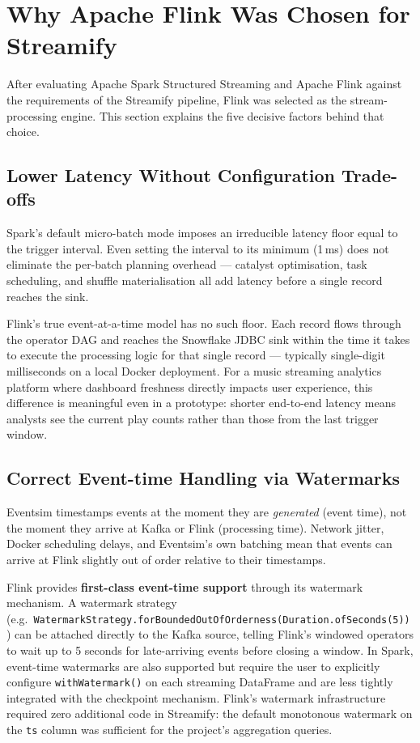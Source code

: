 \section{Why Apache Flink Was Chosen for Streamify}

After evaluating Apache Spark Structured Streaming and Apache Flink against the requirements
of the Streamify pipeline, Flink was selected as the stream-processing engine.
This section explains the five decisive factors behind that choice.

\subsection{Lower Latency Without Configuration Trade-offs}

Spark's default micro-batch mode imposes an irreducible latency floor equal to the trigger
interval.
Even setting the interval to its minimum (1\,ms) does not eliminate the per-batch planning
overhead — catalyst optimisation, task scheduling, and shuffle materialisation all add latency
before a single record reaches the sink.

Flink's true event-at-a-time model has no such floor.
Each record flows through the operator DAG and reaches the Snowflake JDBC sink within the
time it takes to execute the processing logic for that single record — typically single-digit
milliseconds on a local Docker deployment.
For a music streaming analytics platform where dashboard freshness directly impacts user
experience, this difference is meaningful even in a prototype: shorter end-to-end latency
means analysts see the current play counts rather than those from the last trigger window.

\subsection{Correct Event-time Handling via Watermarks}

Eventsim timestamps events at the moment they are \emph{generated} (event time), not the moment
they arrive at Kafka or Flink (processing time).
Network jitter, Docker scheduling delays, and Eventsim's own batching mean that events can
arrive at Flink slightly out of order relative to their timestamps.

Flink provides \textbf{first-class event-time support} through its watermark mechanism.
A watermark strategy (e.g.\ \texttt{WatermarkStrategy.forBoundedOutOfOrderness(Duration.ofSeconds(5))})
can be attached directly to the Kafka source, telling Flink's windowed operators to wait up to
5 seconds for late-arriving events before closing a window.
In Spark, event-time watermarks are also supported but require the user to explicitly configure
\texttt{withWatermark()} on each streaming DataFrame and are less tightly integrated with the
checkpoint mechanism.
Flink's watermark infrastructure required zero additional code in Streamify: the default
monotonous watermark on the \texttt{ts} column was sufficient for the project's aggregation queries.

